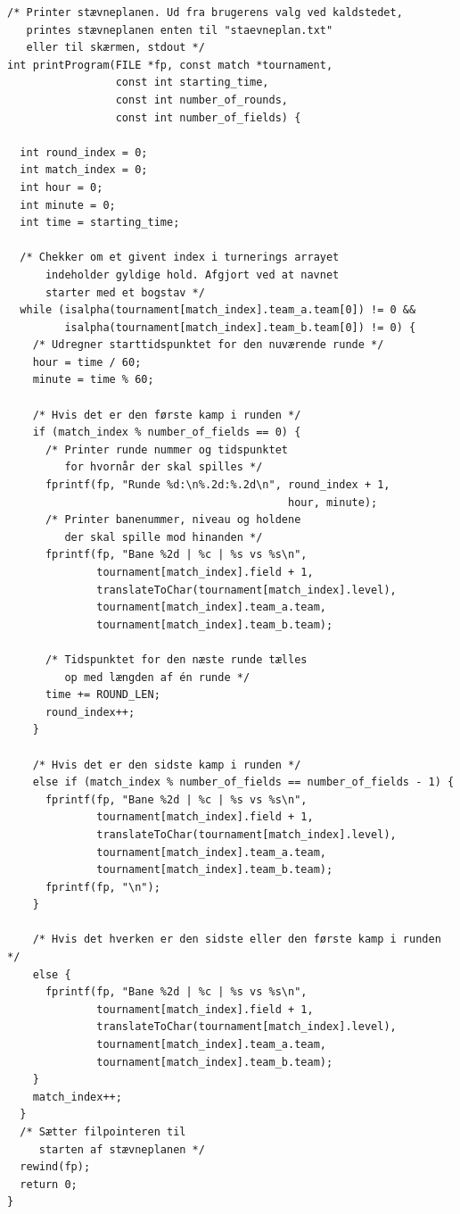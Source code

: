 \begin{source}
\begin{verbatim}
/* Printer stævneplanen. Ud fra brugerens valg ved kaldstedet,
   printes stævneplanen enten til "staevneplan.txt" 
   eller til skærmen, stdout */
int printProgram(FILE *fp, const match *tournament, 
                 const int starting_time, 
                 const int number_of_rounds, 
                 const int number_of_fields) {
                 
  int round_index = 0;
  int match_index = 0;
  int hour = 0;
  int minute = 0;
  int time = starting_time;

  /* Chekker om et givent index i turnerings arrayet 
      indeholder gyldige hold. Afgjort ved at navnet 
      starter med et bogstav */
  while (isalpha(tournament[match_index].team_a.team[0]) != 0 && 
         isalpha(tournament[match_index].team_b.team[0]) != 0) {
    /* Udregner starttidspunktet for den nuværende runde */
    hour = time / 60;
    minute = time % 60;

    /* Hvis det er den første kamp i runden */
    if (match_index % number_of_fields == 0) {
      /* Printer runde nummer og tidspunktet 
         for hvornår der skal spilles */
      fprintf(fp, "Runde %d:\n%.2d:%.2d\n", round_index + 1, 
                                            hour, minute);
      /* Printer banenummer, niveau og holdene 
         der skal spille mod hinanden */
      fprintf(fp, "Bane %2d | %c | %s vs %s\n", 
              tournament[match_index].field + 1, 
              translateToChar(tournament[match_index].level),
              tournament[match_index].team_a.team, 
              tournament[match_index].team_b.team);

      /* Tidspunktet for den næste runde tælles 
         op med længden af én runde */
      time += ROUND_LEN;
      round_index++;
    }

    /* Hvis det er den sidste kamp i runden */
    else if (match_index % number_of_fields == number_of_fields - 1) {
      fprintf(fp, "Bane %2d | %c | %s vs %s\n", 
              tournament[match_index].field + 1, 
              translateToChar(tournament[match_index].level),
              tournament[match_index].team_a.team, 
              tournament[match_index].team_b.team);
      fprintf(fp, "\n");
    }

    /* Hvis det hverken er den sidste eller den første kamp i runden */
    else {
      fprintf(fp, "Bane %2d | %c | %s vs %s\n", 
              tournament[match_index].field + 1, 
              translateToChar(tournament[match_index].level),
              tournament[match_index].team_a.team, 
              tournament[match_index].team_b.team);
    }
    match_index++;
  }
  /* Sætter filpointeren til 
     starten af stævneplanen */
  rewind(fp);
  return 0;
}
\end{verbatim}
\label{code:printProgram}
\end{source}

